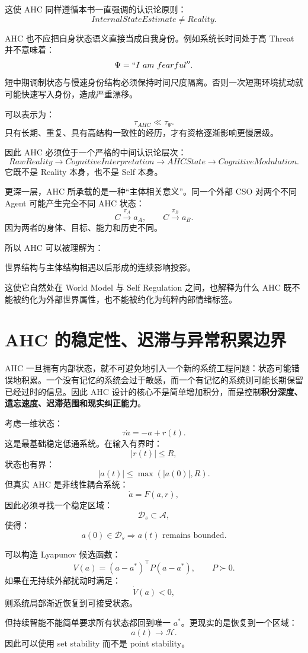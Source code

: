 这使 AHC 同样遵循本书一直强调的认识论原则：
\[
\boxed{
InternalStateEstimate
\neq
Reality.
}
\]

AHC 也不应把自身状态语义直接当成自我身份。例如系统长时间处于高 Threat 并不意味着：
\[
\Psi
=
``I\ am\ fearful''.
\]
短中期调制状态与慢速身份结构必须保持时间尺度隔离。否则一次短期环境扰动就可能快速写入身份，造成严重漂移。

可以表示为：
\[
\tau_{AHC}
\ll
\tau_{\Psi}.
\]
只有长期、重复、具有高结构一致性的经历，才有资格逐渐影响更慢层级。

因此 AHC 必须位于一个严格的中间认识论层次：
\[
RawReality
\rightarrow
CognitiveInterpretation
\rightarrow
AHCState
\rightarrow
CognitiveModulation.
\]
它既不是 Reality 本身，也不是 Self 本身。

更深一层，AHC 所承载的是一种“主体相关意义”。同一个外部 CSO 对两个不同 Agent 可能产生完全不同 AHC 状态：
\[
C
\xrightarrow{\pi_A}
a_A,
\qquad
C
\xrightarrow{\pi_B}
a_B.
\]
因为两者的身体、目标、能力和历史不同。

所以 AHC 可以被理解为：
\begin{statementbox}
世界结构与主体结构相遇以后形成的连续影响投影。
\end{statementbox}
这使它自然处在 World Model 与 Self Regulation 之间，也解释为什么 AHC 既不能被约化为外部世界属性，也不能被约化为纯粹内部情绪标签。

\section{AHC 的稳定性、迟滞与异常积累边界}

AHC 一旦拥有内部状态，就不可避免地引入一个新的系统工程问题：状态可能错误地积累。一个没有记忆的系统会过于敏感，而一个有记忆的系统则可能长期保留已经过时的信息。因此 AHC 设计的核心不是简单增加积分，而是控制\textbf{积分深度、遗忘速度、迟滞范围和现实纠正能力}。

考虑一维状态：
\[
\tau\dot a
=
-a+r(t).
\]
这是最基础稳定低通系统。在输入有界时：
\[
|r(t)|\leq R,
\]
状态也有界：
\[
|a(t)|\leq
\max(|a(0)|,R).
\]
但真实 AHC 是非线性耦合系统：
\[
\dot a
=
F(a,r),
\]
因此必须寻找一个稳定区域：
\[
\mathcal D_s
\subset
\mathcal A,
\]
使得：
\[
a(0)\in\mathcal D_s
\Rightarrow
a(t)
\text{ remains bounded}.
\]

可以构造 Lyapunov 候选函数：
\[
V(a)
=
(a-a^\ast)^\top
P
(a-a^\ast),
\qquad
P\succ0.
\]
如果在无持续外部扰动时满足：
\[
\dot V(a)<0,
\]
则系统局部渐近恢复到可接受状态。

但持续智能不能简单要求所有状态都回到唯一 \(a^\ast\)。更现实的是恢复到一个区域：
\[
a(t)\rightarrow\mathcal H.
\]
因此可以使用 set stability 而不是 point stability。

